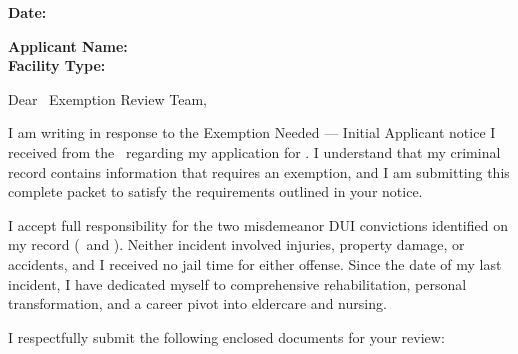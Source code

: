 
\applicantblock

\vspace{0.5em}
\noindent\textbf{Date:} \SubmissionDate

\vspace{1em}
\agencyblock

\sectionrule

\noindent\textbf{Applicant Name:} \ApplicantName\\
\textbf{Facility Type:} \FacilityType

\sectionrule

\vspace{0.5em}
Dear \BranchAbbrev\ Exemption Review Team,

I am writing in response to the Exemption Needed --- Initial Applicant notice I received from the \BranchFull\ regarding my application for \CertificationType. I understand that my criminal record contains information that requires an exemption, and I am submitting this complete packet to satisfy the requirements outlined in your notice.

I accept full responsibility for the two misdemeanor DUI convictions identified on my record (\IncidentOneDate\ and \IncidentTwoDate). Neither incident involved injuries, property damage, or accidents, and I received no jail time for either offense. Since the date of my last incident, I have dedicated myself to comprehensive rehabilitation, personal transformation, and a career pivot into eldercare and nursing.

I respectfully submit the following enclosed documents for your review:

